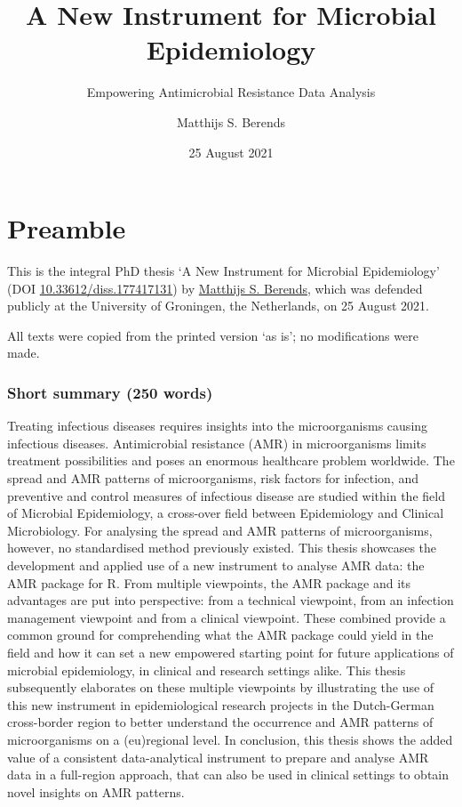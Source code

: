 \documentclass[
]{book}
\title{A New Instrument for Microbial Epidemiology}
\subtitle{Empowering Antimicrobial Resistance Data Analysis}
\author{Matthijs S. Berends}
\date{25 August 2021}
\begin{document}
\maketitle

{
\setcounter{tocdepth}{1}
\tableofcontents
}
\hypertarget{preamble}{%
\chapter*{Preamble}\label{preamble}}

This is the integral PhD thesis `A New Instrument for Microbial Epidemiology' (DOI \href{https://doi.org/10.33612/diss.177417131}{10.33612/diss.177417131}) by \href{https://www.rug.nl/staff/m.s.berends}{Matthijs S. Berends}, which was defended publicly at the University of Groningen, the Netherlands, on 25 August 2021.

All texts were copied from the printed version `as is'; no modifications were made.

\hypertarget{short-summary-250-words}{%
\subsection*{Short summary (250 words)}\label{short-summary-250-words}}

Treating infectious diseases requires insights into the microorganisms causing infectious diseases. Antimicrobial resistance (AMR) in microorganisms limits treatment possibilities and poses an enormous healthcare problem worldwide. The spread and AMR patterns of microorganisms, risk factors for infection, and preventive and control measures of infectious disease are studied within the field of Microbial Epidemiology, a cross-over field between Epidemiology and Clinical Microbiology. For analysing the spread and AMR patterns of microorganisms, however, no standardised method previously existed. This thesis showcases the development and applied use of a new instrument to analyse AMR data: the AMR package for R. From multiple viewpoints, the AMR package and its advantages are put into perspective: from a technical viewpoint, from an infection management viewpoint and from a clinical viewpoint. These combined provide a common ground for comprehending what the AMR package could yield in the field and how it can set a new empowered starting point for future applications of microbial epidemiology, in clinical and research settings alike. This thesis subsequently elaborates on these multiple viewpoints by illustrating the use of this new instrument in epidemiological research projects in the Dutch-German cross-border region to better understand the occurrence and AMR patterns of microorganisms on a (eu)regional level. In conclusion, this thesis shows the added value of a consistent data-analytical instrument to prepare and analyse AMR data in a full-region approach, that can also be used in clinical settings to obtain novel insights on AMR patterns.
\end{document}
